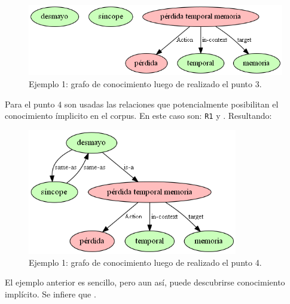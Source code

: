 \vspace{-0.05in}
\begin{figure}[H]
	\begin{center}
		\includegraphics[width=4.7in]{graphics/knowledge_graph_example1_2.png}
		\caption[Ejemplo 1: grafo de conocimiento luego de realizado el punto 3]{Ejemplo 1: grafo de conocimiento luego de realizado el punto 3.}
		\label{fig:knowledge_graph1.2}
	\end{center}
\end{figure}

\vspace{-0.25in}
Para el punto $4$ son usadas las relaciones que potencialmente posibilitan el conocimiento ímplicito en el corpus. En este caso son: \texttt{R1} y \texttt{\textasteriskcentered}. Resultando:

\vspace{-0.05in}
\begin{figure}[H]
	\begin{center}
		\includegraphics[width=3.6in]{graphics/knowledge_graph_example1_3.png}
		\caption[Ejemplo 1: grafo de conocimiento luego de realizado el punto 4]{Ejemplo 1: grafo de conocimiento luego de realizado el punto 4.}
		\label{fig:knowledge_graph1.3}
	\end{center}
\end{figure}

El ejemplo anterior es sencillo, pero aun así, puede descubrirse conocimiento implícito. Se infiere que .

\vspace{-0.1in}
